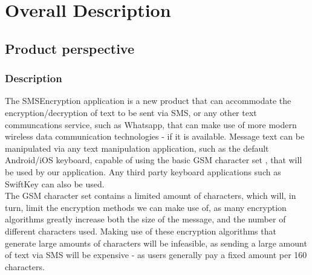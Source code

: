 \section{Overall Description}

\subsection{Product perspective}

\subsubsection{Description}
The SMSEncryption application is a new product that can accommodate the encryption/decryption of text to be sent via SMS, or any other text communcations service, such as Whatsapp, that can make use of more modern wireless data communication technologies - if it is available. Message text can be manipulated via any text manipulation application, such as the default Android/iOS keyboard, capable of using the basic GSM character set , that will be used by our application. Any third party keyboard applications such as SwiftKey can also be used.
\vspace{12pt}\\
The GSM character set contains a limited amount of characters, which will, in turn, limit the encryption methods we can make use of, as many encryption algorithms greatly increase both the size of the message, and the number of different characters used. Making use of these encryption algorithms that generate large amounts of characters will be infeasible, as sending a large amount of text via SMS will be expensive - as users generally pay a fixed amount per 160 characters.
